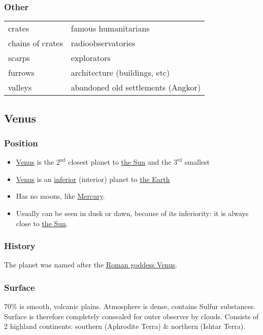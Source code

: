 \subsubsection{Other}
\begin{center}
	\begin{tabular}{l l}
		crates & famous humanitarians\\
		chains of crates & radioobservatories\\
		scarps & explorators\\
		furrows & architecture (buildings, etc)\\
		valleys & abandoned old settlements (Angkor)\\
	\end{tabular}
\end{center}

\subsection{Venus}
\label{planet:venus}
\subsubsection{Position}
\begin{itemize}
	\item \hyperref[planet:venus]{Venus} is the $2^{\text{nd}}$ closest
		planet to \hyperref[star:sun]{the Sun} and the $3^{\text{rd}}$
		smallest
	\item \hyperref[planet:venus]{Venus} is an
		\href{https://en.m.wikipedia.org/wiki/Inferior_and_superior_planets}{inferior}
		(interior) planet to \hyperref[planet:earth]{the Earth}
	\item Has no moons, like \hyperref[planet:mercury]{Mercury}.
	\item Usually can be seen in dusk or dawn, because of its inferiority:
		it is always close to \hyperref[star:sun]{the Sun}.
\end{itemize}
\subsubsection{History}
The planet was named after the
\href{https://en.wikipedia.org/wiki/Goddess_Venus}{Roman goddess Venus}.
\subsubsection{Surface}
70\% is smooth, volcanic plains. Atmosphere is dense, contains Sulfur
substances. Surface is therefore completely consealed for outer observer by
clouds. Consists of 2 highland continents: southern (Aphrodite Terra) \&
northern (Ishtar Terra).

